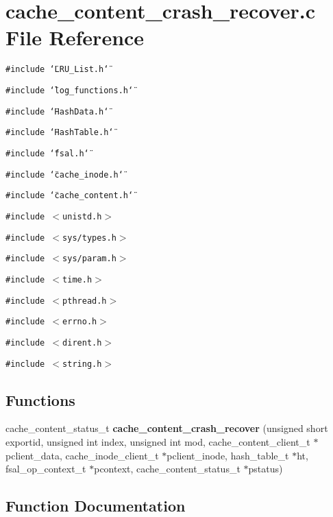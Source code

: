 \section{cache\_\-content\_\-crash\_\-recover.c File Reference}
\label{cache__content__crash__recover_8c}
{\tt \#include \char`\"{}LRU\_\-List.h\char`\"{}}\par
{\tt \#include \char`\"{}log\_\-functions.h\char`\"{}}\par
{\tt \#include \char`\"{}HashData.h\char`\"{}}\par
{\tt \#include \char`\"{}HashTable.h\char`\"{}}\par
{\tt \#include \char`\"{}fsal.h\char`\"{}}\par
{\tt \#include \char`\"{}cache\_\-inode.h\char`\"{}}\par
{\tt \#include \char`\"{}cache\_\-content.h\char`\"{}}\par
{\tt \#include $<$unistd.h$>$}\par
{\tt \#include $<$sys/types.h$>$}\par
{\tt \#include $<$sys/param.h$>$}\par
{\tt \#include $<$time.h$>$}\par
{\tt \#include $<$pthread.h$>$}\par
{\tt \#include $<$errno.h$>$}\par
{\tt \#include $<$dirent.h$>$}\par
{\tt \#include $<$string.h$>$}\par
\subsection*{Functions}
\begin{CompactItemize}
\item 
cache\_\-content\_\-status\_\-t {\bf cache\_\-content\_\-crash\_\-recover} (unsigned short exportid, unsigned int index, unsigned int mod, cache\_\-content\_\-client\_\-t $\ast$pclient\_\-data, cache\_\-inode\_\-client\_\-t $\ast$pclient\_\-inode, hash\_\-table\_\-t $\ast$ht, fsal\_\-op\_\-context\_\-t $\ast$pcontext, cache\_\-content\_\-status\_\-t $\ast$pstatus)
\end{CompactItemize}


\subsection{Function Documentation}
